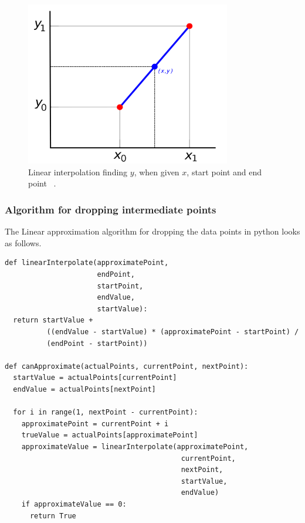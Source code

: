 \documentclass[12pt]{article}
\begin{document}
{\begin{figure}[H]
  \centering
  \includegraphics[width=0.8\textwidth]{linear_interpolation}
  \caption{Linear interpolation finding $y$, when given $x$, start point and end point ~\cite{linear_interpolation}.}
  \label{fig:linear_interpolation}
\end{figure}

\subsubsection{Algorithm for dropping intermediate points}

The Linear approximation algorithm for dropping the data points in python looks as follows.

\begin{lstlisting}
def linearInterpolate(approximatePoint,
                      endPoint,
                      startPoint,
                      endValue,
                      startValue):
  return startValue +
          ((endValue - startValue) * (approximatePoint - startPoint) /
          (endPoint - startPoint))

def canApproximate(actualPoints, currentPoint, nextPoint):
  startValue = actualPoints[currentPoint]
  endValue = actualPoints[nextPoint]

  for i in range(1, nextPoint - currentPoint):
    approximatePoint = currentPoint + i
    trueValue = actualPoints[approximatePoint]
    approximateValue = linearInterpolate(approximatePoint,
                                          currentPoint,
                                          nextPoint,
                                          startValue,
                                          endValue)
    if approximateValue == 0:
      return True


\end{lstlisting}}
\end{document}
